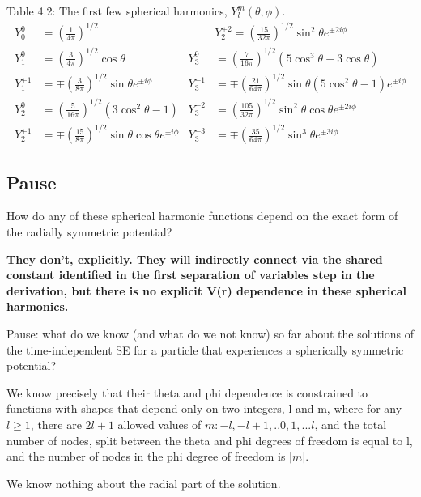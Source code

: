 \documentclass{article}
\begin{document}
Table 4.2: The first few spherical harmonics, $Y_{l}^{m}(\theta, \phi)$.
$$
\begin{aligned}
Y_{0}^{0} &=\left(\frac{1}{4 \pi}\right)^{1 / 2} & & Y_{2}^{\pm 2}=\left(\frac{15}{32 \pi}\right)^{1 / 2} \sin ^{2} \theta e^{\pm 2 i \phi} \\
\hline
Y_{1}^{0} &=\left(\frac{3}{4 \pi}\right)^{1 / 2} \cos \theta & Y_{3}^{0} &=\left(\frac{7}{16 \pi}\right)^{1 / 2}\left(5 \cos ^{3} \theta-3 \cos \theta\right) \\
\hline
Y_{1}^{\pm 1} &=\mp\left(\frac{3}{8 \pi}\right)^{1 / 2} \sin \theta e^{\pm i \phi} & Y_{3}^{\pm 1} &=\mp\left(\frac{21}{64 \pi}\right)^{1 / 2} \sin \theta\left(5 \cos ^{2} \theta-1\right) e^{\pm i \phi} \\
\hline
Y_{2}^{0} &=\left(\frac{5}{16 \pi}\right)^{1 / 2}\left(3 \cos ^{2} \theta-1\right) & Y_{3}^{\pm 2} &=\left(\frac{105}{32 \pi}\right)^{1 / 2} \sin ^{2} \theta \cos \theta e^{\pm 2 i \phi} \\
\hline
Y_{2}^{\pm 1} &=\mp\left(\frac{15}{8 \pi}\right)^{1 / 2} \sin \theta \cos \theta e^{\pm i \phi} & Y_{3}^{\pm 3} &=\mp\left(\frac{35}{64 \pi}\right)^{1 / 2} \sin ^{3} \theta e^{\pm 3 i \phi}
\end{aligned}
$$

\subsection{Pause}

How do any of these spherical harmonic functions depend on the exact form of the radially symmetric potential?

\textbf{They don’t, explicitly.  They will indirectly connect via the shared constant identified in the first separation of variables step in the derivation, but there is no explicit V(r) dependence in these spherical harmonics.
}

Pause: what do we know (and what do we not know) so far about the solutions of the time-independent SE for a particle that experiences a spherically symmetric potential?  

We know precisely that their theta and phi dependence is constrained to functions with shapes that depend only on two integers, l and m, where for any $l \geq 1$, there are $2l+1$ allowed values of $m: -l, -l+1,..0,1,...l$, and the total number of nodes, split between the theta and phi degrees of freedom is equal to l, and the number of nodes in the phi degree of freedom is $|m|$.

We know nothing about the radial part of the solution.
\end{document}
